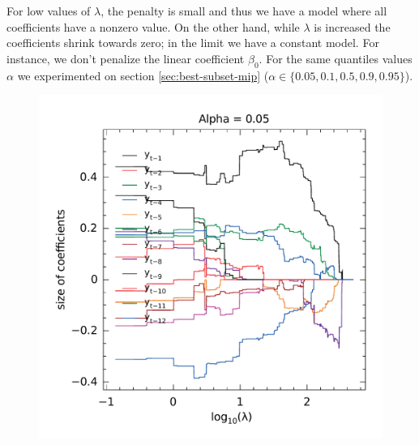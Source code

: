 For low values of $\lambda$, the penalty is small and thus we have a model where all coefficients have a nonzero value. On the other hand, while $\lambda$ is increased the coefficients shrink towards zero; in the limit we have a constant model. For instance, we don't penalize the linear coefficient $\beta_0$. For the same quantiles values $\alpha$ we experimented on section \ref{sec:best-subset-mip} ($\alpha \in \{0.05, 0.1, 0.5, 0.9, 0.95\}$). 


\begin{figure}
	\centering
	\begin{minipage}[t]{0.4\linewidth}
		\centering
		\begin{minipage}[t]{\linewidth}
			\centering     \includegraphics[width=\textwidth]{Figuras/selecao-lasso/par-sellasso-005.pdf}
		\end{minipage}
		\begin{minipage}[b]{\linewidth}

\end{minipage}
\end{minipage}
\end{figure}
